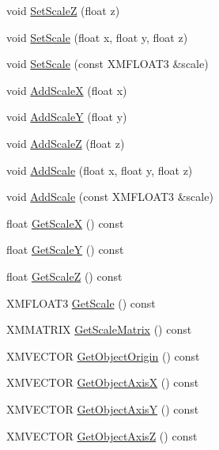 \begin{DoxyCompactItemize}
void \hyperlink{structmage_1_1_transform_af8cd0167f776708697041544886ff2de}{Set\+ScaleZ} (float z)
\item 
void \hyperlink{structmage_1_1_transform_a6c7e193f6bfddb8c7af5c35b538cdee5}{Set\+Scale} (float x, float y, float z)
\item 
void \hyperlink{structmage_1_1_transform_a72e4788366a1638a80fd124e344d0d33}{Set\+Scale} (const X\+M\+F\+L\+O\+A\+T3 \&scale)
\item 
void \hyperlink{structmage_1_1_transform_afb49f4e4ca1772f8ed38465afcf414a0}{Add\+ScaleX} (float x)
\item 
void \hyperlink{structmage_1_1_transform_ae3213b5cc2b347236783389c1b717356}{Add\+ScaleY} (float y)
\item 
void \hyperlink{structmage_1_1_transform_aa493f3a588376d094ce50dfcffe0ece2}{Add\+ScaleZ} (float z)
\item 
void \hyperlink{structmage_1_1_transform_a10681b78ac7980fa3aa6c6c11a274f99}{Add\+Scale} (float x, float y, float z)
\item 
void \hyperlink{structmage_1_1_transform_a7f5092b95426c47a55bd3dff16cea31e}{Add\+Scale} (const X\+M\+F\+L\+O\+A\+T3 \&scale)
\item 
float \hyperlink{structmage_1_1_transform_a3a82465d40dde6b98ca274a8de061545}{Get\+ScaleX} () const
\item 
float \hyperlink{structmage_1_1_transform_acbd677fa7e27cb15d205ac8354d8624a}{Get\+ScaleY} () const
\item 
float \hyperlink{structmage_1_1_transform_a9e8f3a4ec330e6f4c9e1a9607daf30fa}{Get\+ScaleZ} () const
\item 
X\+M\+F\+L\+O\+A\+T3 \hyperlink{structmage_1_1_transform_a38234d822ee1ffbbcfb2601a1d5f8475}{Get\+Scale} () const
\item 
X\+M\+M\+A\+T\+R\+IX \hyperlink{structmage_1_1_transform_ab78050be41abf1ab36d969d5235f97e2}{Get\+Scale\+Matrix} () const
\item 
X\+M\+V\+E\+C\+T\+OR \hyperlink{structmage_1_1_transform_a2f7cfedf5c67115cb6c29aac07c71d07}{Get\+Object\+Origin} () const
\item 
X\+M\+V\+E\+C\+T\+OR \hyperlink{structmage_1_1_transform_a1817e9ff4397b5a107541b92a01b91fc}{Get\+Object\+AxisX} () const
\item 
X\+M\+V\+E\+C\+T\+OR \hyperlink{structmage_1_1_transform_a1d2b560af18a18246186cdb8477e9019}{Get\+Object\+AxisY} () const
\item 
X\+M\+V\+E\+C\+T\+OR \hyperlink{structmage_1_1_transform_af6bf20352279957fdba5041074bdf9c2}{Get\+Object\+AxisZ} () const

\end{DoxyCompactItemize}
